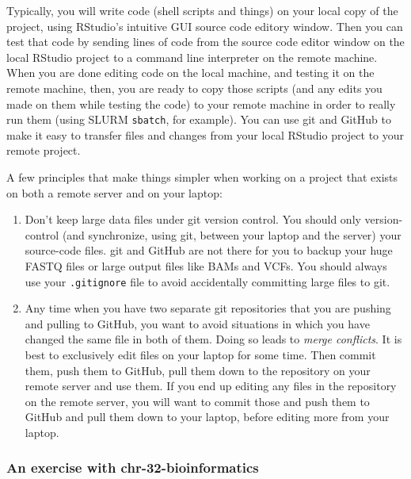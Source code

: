 \documentclass[]{krantz}
\providecommand{\tightlist}{%
  \setlength{\itemsep}{0pt}\setlength{\parskip}{0pt}}
\begin{document}
Typically, you will write code
(shell scripts and things) on your local copy of the project, using RStudio's
intuitive GUI source code editory window. Then you can test that code by
sending lines of code from the source code editor window on the local RStudio project
to a command line interpreter on the remote machine. When you are done editing code
on the local machine, and testing it on the remote machine, then, you are ready
to copy those scripts (and any edits you made on them while testing the code) to your
remote machine in order to really run them (using SLURM \texttt{sbatch}, for example).
You can use git and GitHub to make it easy to transfer files and changes from your local
RStudio project to your remote project.

A few principles that make things simpler when working on a project that exists
on both a remote server and on your laptop:

\begin{enumerate}
\def\labelenumi{\arabic{enumi}.}
\tightlist
\item
  Don't keep large data files under git version control. You should only
  version-control (and synchronize, using git, between your laptop and the server)
  your source-code files. git and GitHub are not there for you to backup your huge
  FASTQ files or large output files like BAMs and VCFs. You should always
  use your \texttt{.gitignore} file to avoid accidentally committing large files to git.
\item
  Any time when you have two separate git repositories that you are pushing and
  pulling to GitHub, you want to avoid situations in which you have changed the same
  file in both of them. Doing so leads to \emph{merge conflicts}. It is best to exclusively
  edit files on your laptop for some time. Then commit them, push them to GitHub,
  pull them down to the repository on your remote server and use them. If you end up
  editing any files in the repository on the remote server, you will want to commit those
  and push them to GitHub and pull them down to your laptop, before editing more from
  your laptop.
\end{enumerate}

\hypertarget{an-exercise-with-chr-32-bioinformatics}{%
\subsubsection{An exercise with chr-32-bioinformatics}\label{an-exercise-with-chr-32-bioinformatics}}
\end{document}
